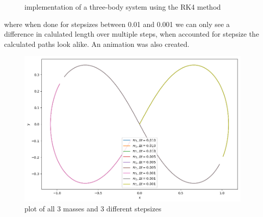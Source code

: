 \documentclass[11pt, a4paper, reqno]{scrartcl}
\begin{document}
        \begin{figure}[H]
            
        \end{figure}
        \begin{figure}[H]
            
            \caption{implementation of a three-body system using the RK4 method}
        \end{figure}
        where when done for stepsizes between 0.01 and 0.001 we can only see a difference in calulated length over multiple steps, when accounted for stepsize the calculated paths look alike. 
        An animation was also created.
        \begin{landscape}
            \begin{figure}
                \includegraphics[width=\paperwidth]{3-21-plot}
                \caption{plot of all 3 masses and 3 different stepsizes}
            \end{figure}
        \end{landscape}
    
        
        
        
\end{document}
